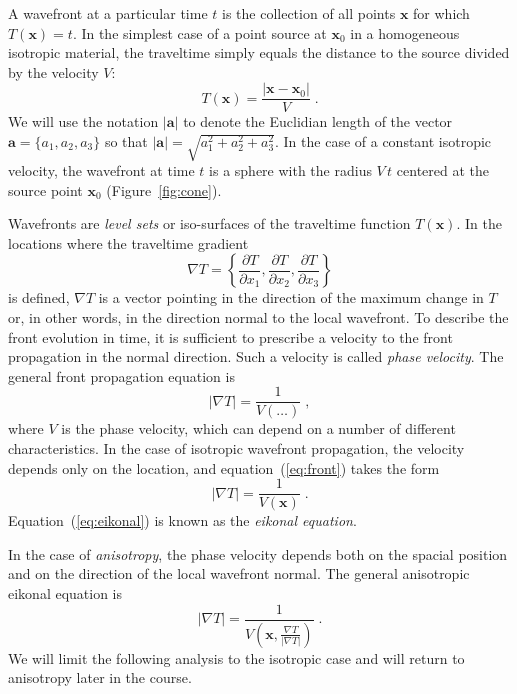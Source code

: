 A wavefront at a particular time $t$ is the collection of all points
$\mathbf{x}$  for which $T(\mathbf{x}) = t$. In the simplest case of a
point source at $\mathbf{x}_0$ in a homogeneous isotropic material,
the traveltime simply equals the distance to the source divided by the
velocity $V$:
\begin{equation}
  \label{eq:const}
  T(\mathbf{x}) = \frac{\left|\mathbf{x}-\mathbf{x}_0\right|}{V}\;.
\end{equation}
We will use the notation $|\mathbf{a}|$ to denote the Euclidian length
of the vector $\mathbf{a}=\{a_1,a_2,a_3\}$ so that
$|\mathbf{a}|=\sqrt{a_1^2+a_2^2+a_3^2}$. In the case of a constant
isotropic velocity, the wavefront at time $t$ is a sphere with the
radius $V\,t$ centered at the source point $\mathbf{x}_0$
(Figure~\ref{fig:cone}).


Wavefronts are \emph{level sets} or iso-surfaces of the traveltime
function $T(\mathbf{x})$. In the locations where the traveltime gradient 
\[
\nabla T = \left\{
\frac{\partial T}{\partial x_1},
\frac{\partial T}{\partial x_2},
\frac{\partial T}{\partial x_3}\right\}
\]
is defined, $\nabla T$ is a vector pointing in the direction of the
maximum change in $T$ or, in other words, in the direction normal to
the local wavefront. To describe the front evolution in time, it is
sufficient to prescribe a velocity to the front propagation in the
normal direction. Such a velocity is called \emph{phase velocity}. The
general front propagation equation is
\begin{equation}
  \label{eq:front}
  \left|\nabla T\right| = \frac{1}{V(\ldots)}\;,
\end{equation}
where $V$ is the phase velocity, which can depend on a number of
different characteristics. In the case of isotropic wavefront
propagation, the velocity depends only on the location, and
equation~(\ref{eq:front}) takes the form
\begin{equation}
  \label{eq:eikonal}
  \left|\nabla T\right| = \frac{1}{V(\mathbf{x})}\;.
\end{equation}
Equation~(\ref{eq:eikonal}) is known as the \emph{eikonal equation}.

In the case of \emph{anisotropy}, the phase velocity depends both on
the spacial position and on the direction of the local wavefront
normal. The general anisotropic eikonal equation is
\begin{equation}
  \label{eq:anisoeikonal}
  \left|\nabla T\right| = 
  \frac{1}{V\left(\mathbf{x},\frac{\nabla T}{\left|\nabla T\right|}\right)}\;.
\end{equation}
We will limit the following analysis to the isotropic case and will return
to anisotropy later in the course.

